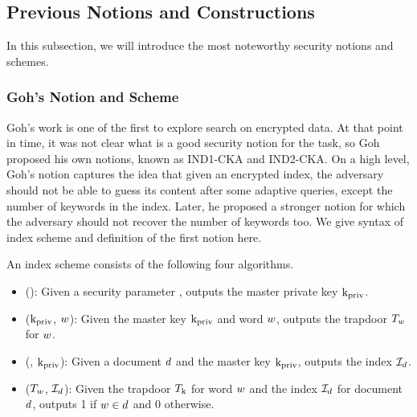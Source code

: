 \subsection{Previous Notions and Constructions}
In this subsection, we will introduce the most noteworthy security notions and schemes.
 
\subsubsection{Goh's Notion and Scheme}
Goh's work \cite{EPRINT:Goh03} is one of the first to explore search on encrypted data. At that point in time, it was not clear what is a good security notion for the task, so Goh proposed his own notions, known as IND1-CKA and IND2-CKA. On a high level, Goh's notion captures the idea that given an encrypted index, the adversary should not be able to guess its content after some adaptive queries, except the number of keywords in the index. Later, he proposed a stronger notion for which the adversary should not recover the number of keywords too. We give syntax of index scheme and definition of the first notion here.

\begin{definition} \label{Defintion: Index Scheme}
	\normalfont
	An index scheme consists of the following four algorithms.
	\begin{itemize}
		\item \kgen(\secparam): Given a security parameter \secparam, outputs the master private key $\text{k}_{\text{priv}}$.
		
		\item \Trapdoor($\text{k}_{\text{priv}}$, $w$): Given the master key $\text{k}_{\text{priv}}$ and word $w$, outputs the trapdoor $T_w$ for $w$.
		
		\item \buildindex(\doc, $\text{k}_{\text{priv}}$): Given a document $d$ and the master key $\text{k}_{\text{priv}}$, outputs the index $\mathcal{I}_d$.
		
		\item \searchindex($T_w$, $\mathcal{I}_d$): Given the trapdoor $T_{\text{k}}$ for word $w$ and the index $\mathcal{I}_d$ for document $d$, outputs 1 if $w \in d$ and 0 otherwise.
	\end{itemize}
\end{definition}



